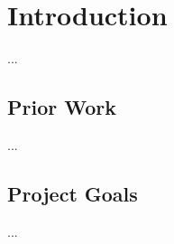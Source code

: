 

\chapter{Introduction}
\label{chap:intro}

...

\section{Prior Work}
\label{sec:priorworks}

...


\section{Project Goals}
\label{sec:goals}


...

